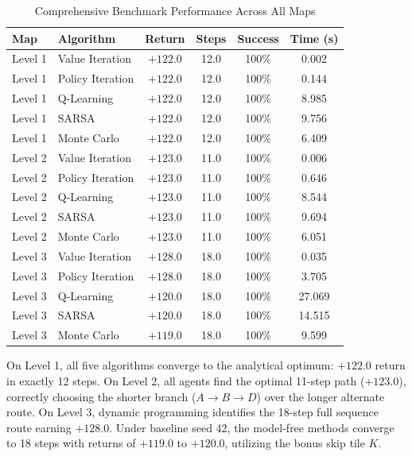 \documentclass[10pt,conference]{IEEEtran}
\begin{document}
\begin{table}[htbp]
\caption{Comprehensive Benchmark Performance Across All Maps}
\label{tab:modelfree_results}
\centering
\begin{tabular}{llcccc}
\toprule
\textbf{Map} & \textbf{Algorithm} & \textbf{Return} & \textbf{Steps} & \textbf{Success} & \textbf{Time (s)} \\
\midrule
Level 1 & Value Iteration  & $+122.0$ & 12.0 & 100\% & 0.002 \\
Level 1 & Policy Iteration & $+122.0$ & 12.0 & 100\% & 0.144 \\
Level 1 & Q-Learning       & $+122.0$ & 12.0 & 100\% & 8.985 \\
Level 1 & SARSA            & $+122.0$ & 12.0 & 100\% & 9.756 \\
Level 1 & Monte Carlo      & $+122.0$ & 12.0 & 100\% & 6.409 \\
\midrule
Level 2 & Value Iteration  & $+123.0$ & 11.0 & 100\% & 0.006 \\
Level 2 & Policy Iteration & $+123.0$ & 11.0 & 100\% & 0.646 \\
Level 2 & Q-Learning       & $+123.0$ & 11.0 & 100\% & 8.544 \\
Level 2 & SARSA            & $+123.0$ & 11.0 & 100\% & 9.694 \\
Level 2 & Monte Carlo      & $+123.0$ & 11.0 & 100\% & 6.051 \\
\midrule
Level 3 & Value Iteration  & $+128.0$ & 18.0 & 100\% & 0.035 \\
Level 3 & Policy Iteration & $+128.0$ & 18.0 & 100\% & 3.705 \\
Level 3 & Q-Learning       & $+120.0$ & 18.0 & 100\% & 27.069 \\
Level 3 & SARSA            & $+120.0$ & 18.0 & 100\% & 14.515 \\
Level 3 & Monte Carlo      & $+119.0$ & 18.0 & 100\% & 9.599 \\
\bottomrule
\end{tabular}
\end{table}

On Level 1, all five algorithms converge to the analytical optimum: $+122.0$ return in exactly 12 steps. On Level 2, all agents find the optimal 11-step path ($+123.0$), correctly choosing the shorter branch ($A \rightarrow B \rightarrow D$) over the longer alternate route. On Level 3, dynamic programming identifies the 18-step full sequence route earning $+128.0$. Under baseline seed 42, the model-free methods converge to 18 steps with returns of $+119.0$ to $+120.0$, utilizing the bonus skip tile $K$.
\end{document}
